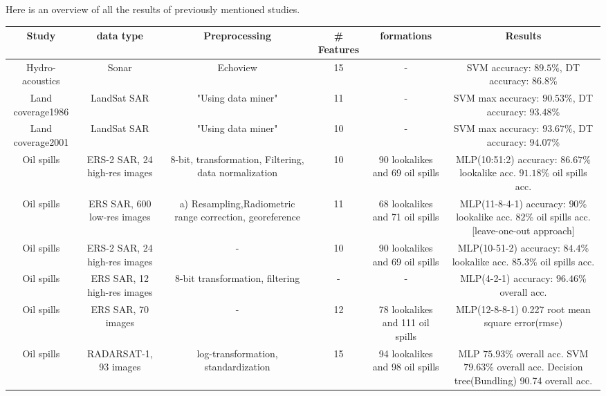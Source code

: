 Here is an overview of all the results of previously mentioned studies.

\begin{table*}[t]
\centering
{}
\tabcolsep=0.19cm
\footnotesize
\begin{tabular}{*{6}{c}}
  Study & data type & Preprocessing & \# Features & formations & Results \\
    \hline
  
    Hydro-acoustics & Sonar & Echoview & 15 &  - & SVM accuracy: $89.5$\%, DT accuracy: $86.8$\% \\

    Land coverage1986 & LandSat SAR & "Using data miner" & 11 &  - & SVM max accuracy: $90.53$\%, DT accuracy: $93.48$\% \\

    Land coverage2001 & LandSat SAR & "Using data miner" & 10 &  - & SVM max accuracy: $93.67$\%, DT accuracy: $94.07$\% \\ 
    
    Oil spills\cite{Topouzelis200762} & ERS-2 SAR, 24 high-res images & 8-bit, transformation, Filtering, data normalization & 10 & 90 lookalikes and 69 oil spills & MLP(10:51:2) accuracy: $86.67$\% lookalike acc. $91.18$\% oil spills acc.\\
    
    Oil spills\cite{Delfrate200038} & ERS SAR, 600 low-res images & a) Resampling,Radiometric range correction, georeference & 11 & 68 lookalikes and 71 oil spills & MLP(11-8-4-1) accuracy: $90$\% lookalike acc. $82$\% oil spills acc. [leave-one-out approach]\\
    
    Oil spills\cite{Topouzelis200930} &  ERS-2 SAR, 24 high-res images & - & 10 & 90 lookalikes and 69 oil spills & MLP(10-51-2) accuracy: $84.4$\% lookalike acc. $85.3$\% oil spills acc.\\
    
    Oil spills\cite{Topouzelis200924} &  ERS SAR, 12 high-res images & 8-bit transformation, filtering & - & - & MLP(4-2-1) accuracy: $96.46$\% overall acc. \\
 
    Oil spills\cite{Delfrate2004} &  ERS SAR, 70 images & - & 12 & 78 lookalikes and 111 oil spills & MLP(12-8-8-1) 0.227 root mean square error(rmse)\\
    
    Oil spills\cite{Xu201414} &  RADARSAT-1, 93 images & log-transformation, standardization & 15 & 94 lookalikes and 98 oil spills & MLP $75.93$\% overall acc. SVM $79.63$\% overall acc. Decision tree(Bundling) 90.74 overall acc.\\
    

\end{tabular}
\end{table*}
